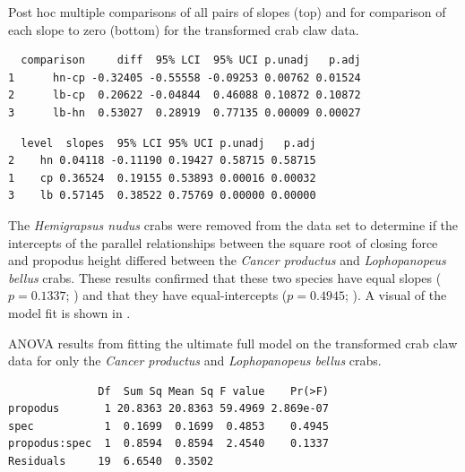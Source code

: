 \documentclass[10pt,openany]{book}\usepackage[]{graphicx}\usepackage[]{color}
\makeatletter
\newenvironment{kframe}{%
 \def\at@end@of@kframe{}%
 \ifinner\ifhmode%
  \def\at@end@of@kframe{\end{minipage}}%
  \begin{minipage}{\columnwidth}%
 \fi\fi%
 \def\FrameCommand##1{\hskip\@totalleftmargin \hskip-\fboxsep
 \colorbox{shadecolor}{##1}\hskip-\fboxsep
     \hskip-\linewidth \hskip-\@totalleftmargin \hskip\columnwidth}%
 \MakeFramed {\advance\hsize-\width
   \@totalleftmargin\z@ \linewidth\hsize
   \@setminipage}}%
 {\par\unskip\endMakeFramed%
 \at@end@of@kframe}
\newenvironment{knitrout}{}{} %
\makeatother
\begin{document}
\begin{table}[h]
  \centering
  \caption{Post hoc multiple comparisons of all pairs of slopes (top) and for comparison of each slope to zero (bottom) for the transformed crab claw data.}\label{tab:IVRCrabSlopeComp}
\begin{knitrout}
\color{fgcolor}\begin{kframe}


{\ttfamily\noindent\itshape\color{messagecolor}{Multiple Slope Comparisons (using the 'holm' adjustment)}}\begin{verbatim}
  comparison     diff  95% LCI  95% UCI p.unadj   p.adj
1      hn-cp -0.32405 -0.55558 -0.09253 0.00762 0.01524
2      lb-cp  0.20622 -0.04844  0.46088 0.10872 0.10872
3      lb-hn  0.53027  0.28919  0.77135 0.00009 0.00027
\end{verbatim}


{\ttfamily\noindent\itshape\color{messagecolor}{\\Slope Information (using the 'holm' adjustment)}}\begin{verbatim}
  level  slopes  95% LCI 95% UCI p.unadj   p.adj
2    hn 0.04118 -0.11190 0.19427 0.58715 0.58715
1    cp 0.36524  0.19155 0.53893 0.00016 0.00032
3    lb 0.57145  0.38522 0.75769 0.00000 0.00000
\end{verbatim}
\end{kframe}
\end{knitrout}
\end{table}


The \emph{Hemigrapsus nudus} crabs were removed from the data set to determine if the intercepts of the parallel relationships between the square root of closing force and propodus height differed between the \emph{Cancer productus} and \emph{Lophopanopeus bellus} crabs.  These results confirmed that these two species have equal slopes ($p=0.1337$; ) and that they have equal-intercepts ($p=0.4945$; ).  A visual of the model fit is shown in .

\begin{table}[h]
  \centering
  \caption{ANOVA results from fitting the ultimate full model on the transformed crab claw data for only the \emph{Cancer productus} and \emph{Lophopanopeus bellus} crabs.}\label{tab:IVRCrabTests2}
\begin{knitrout}
\color{fgcolor}\begin{kframe}
\begin{verbatim}
              Df  Sum Sq Mean Sq F value    Pr(>F)
propodus       1 20.8363 20.8363 59.4969 2.869e-07
spec           1  0.1699  0.1699  0.4853    0.4945
propodus:spec  1  0.8594  0.8594  2.4540    0.1337
Residuals     19  6.6540  0.3502                  
\end{verbatim}
\end{kframe}
\end{knitrout}
\end{table}
\end{document}
